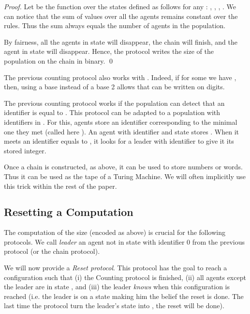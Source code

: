\documentclass[UKenglish]{llncs}
\begin{document}
\begin{proof}
Let  be the function over the states defined as follows for any :
, , , .  We
can notice that the sum of  values over all the agents remains constant over the
rules. Thus the sum always equals the number of agents in the
population.

By fairness, all the agents in state  will disappear, the chain will finish, and the agent in state  will disappear.
Hence, the protocol writes the size of the population on the chain in binary. \hfill \qed
\end{proof}

\begin{remark}
The  previous counting protocol also works with .
Indeed, if for some  we have ,
then, using a base  instead of a base 2 allows that  can
be written on  digits.
\end{remark}

\begin{remark}   The  previous counting protocol  works if the population can detect that  an identifier is equal to . 
This protocol can be adapted to a population 
with identifiers in . For this, agents store an identifier 
corresponding to the minimal one they met (called here ). An agent with identifier  and state 
stores . When it meets an identifier equals to ,
it looks for a leader with identifier  to give it its stored integer.
\end{remark}


Once 
a chain is constructed, as above, it can be used to store numbers or
words. Thus it can be used as the tape of a Turing Machine. We will
often implicitly use this trick within the rest of the paper.  




\subsection{Resetting a Computation}

The computation of the size  (encoded as above) is crucial for the following protocols.  
We call \emph{leader}  an agent not in state  with identifier 0
from the previous protocol (or the chain protocol).


We will now provide a  \emph{Reset  protocol}. This protocol has the goal to reach a configuration
such that (i) the Counting protocol is finished, (ii) all agents except the leader are in state , and (iii)
the leader {\it knows} when this configuration is reached (i.e. the leader is
on a state  making him the belief the reset is done. The last time 
the protocol turn the leader's state into , the reset will be done).
\end{document}
